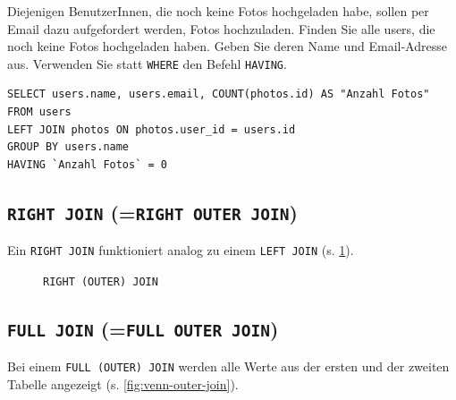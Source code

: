 \begin{myexercise}
  Diejenigen BenutzerInnen, die noch keine Fotos hochgeladen habe, sollen per Email dazu aufgefordert werden, Fotos hochzuladen. Finden Sie alle users, die noch keine Fotos hochgeladen haben. Geben Sie deren Name und Email-Adresse aus. Verwenden Sie statt \lstinline[style=sql]|WHERE| den Befehl \lstinline[style=sql]|HAVING|.
  \begin{myanswer}
    \begin{lstlisting}[style=sql]
SELECT users.name, users.email, COUNT(photos.id) AS "Anzahl Fotos"
FROM users
LEFT JOIN photos ON photos.user_id = users.id
GROUP BY users.name
HAVING `Anzahl Fotos` = 0
\end{lstlisting}
  \end{myanswer}
\end{myexercise}

\subsection{\texorpdfstring{\lstinline[style=sql]|RIGHT JOIN| (=\lstinline[style=sql]|RIGHT OUTER JOIN|)}{RIGHT JOIN (=RIGHT OUTER JOIN)}}
Ein \lstinline[style=sql]|RIGHT JOIN| funktioniert analog zu einem \lstinline[style=sql]|LEFT JOIN| (s. \cref{fig:venn-right-join}).

\begin{figure}[H]
  \centering
  \caption{\lstinline[style=sql]|RIGHT (OUTER) JOIN|}
  \label{fig:venn-right-join}
\end{figure}


\subsection{\texorpdfstring{\lstinline[style=sql]|FULL JOIN| (=\lstinline[style=sql]|FULL OUTER JOIN|)}{FULL JOIN (=FULL OUTER JOIN)}}
Bei einem \lstinline[style=sql]|FULL (OUTER) JOIN| werden alle Werte aus der ersten und der zweiten Tabelle angezeigt (s. \cref{fig:venn-outer-join}).

